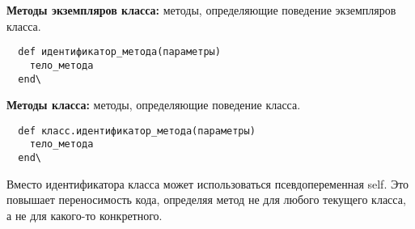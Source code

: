 \textbf{Методы экземпляров класса:} методы, определяющие поведение экземпляров класса.
\begin{verbatim}
  def идентификатор_метода(параметры)
    тело_метода
  end\
\end{verbatim}

\textbf{Методы класса:} методы, определяющие поведение класса.
\begin{verbatim}
  def класс.идентификатор_метода(параметры)
    тело_метода
  end\
\end{verbatim}

\begin{note}
  Вместо идентификатора класса может использоваться псевдопеременная self. Это повышает переносимость кода, определяя метод не для любого текущего класса, а не для какого-то конкретного.
\end{note}

